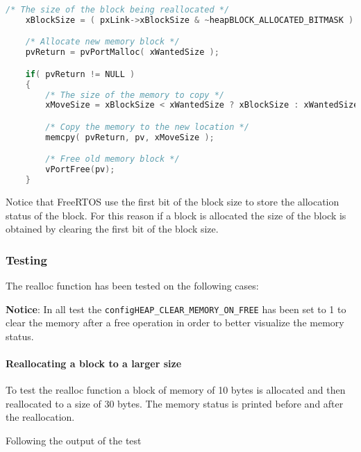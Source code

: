     \begin{codebox}
    \begin{lstlisting}[language=c]
    /* The size of the block being reallocated */
    xBlockSize = ( pxLink->xBlockSize & ~heapBLOCK_ALLOCATED_BITMASK ) - xHeapStructSize;

    /* Allocate new memory block */
    pvReturn = pvPortMalloc( xWantedSize );

    if( pvReturn != NULL )
    {
        /* The size of the memory to copy */
        xMoveSize = xBlockSize < xWantedSize ? xBlockSize : xWantedSize;

        /* Copy the memory to the new location */
        memcpy( pvReturn, pv, xMoveSize );

        /* Free old memory block */
        vPortFree(pv);
    } 
    \end{lstlisting}
    \end{codebox}

    Notice that FreeRTOS use the first bit of the block size to store the allocation status of the block. For this reason if a block is allocated the size of the block is obtained by clearing the first bit of the block size.

    \subsubsection{Testing}
    The realloc function has been tested on the following cases:

    \textbf{Notice}: In all test the \texttt{configHEAP\_CLEAR\_MEMORY\_ON\_FREE} has been set to 1 to clear the memory after a free operation in order to better visualize the memory status.

    \paragraph{Reallocating a block to a larger size}
    To test the realloc function a block of memory of 10 bytes is allocated and then reallocated to a size of 30 bytes. The memory status is printed before and after the reallocation.

    Following the output of the test

